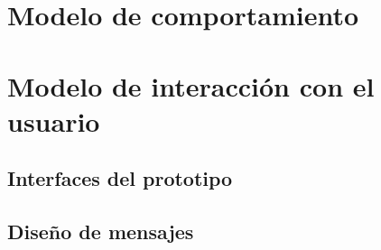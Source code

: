 \documentclass[10pt]{book}
\begin{document}
 \chapter{Modelo de comportamiento}\label{chp:modeloComportamiento}
 \hypertarget{chp:modeloComportamiento}{}
	

\chapter{Modelo de interacción con el usuario}\label{chp:modeloInteraccionUsuario}
\hypertarget{chp:modeloInteraccionUsuario}{}

\section{Interfaces del prototipo}
	
\section{Diseño de mensajes}





\end{document}
